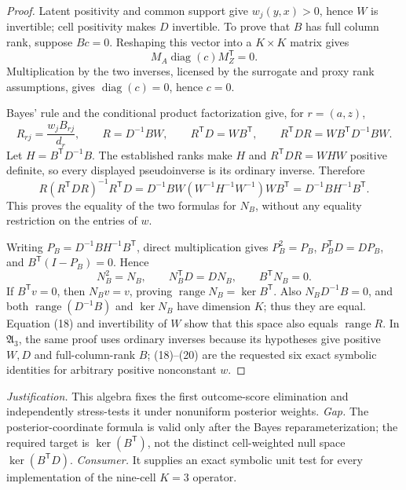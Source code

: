 \documentclass{article}
\begin{document}
\begin{proof}
Latent positivity and common support give \(w_j(y,x)>0\), hence \(W\) is invertible; cell positivity makes \(D\) invertible.  To prove that \(B\) has full column rank, suppose \(Bc=0\).  Reshaping this vector into a \(K\times K\) matrix gives
\[
M_A\operatorname{diag}(c)M_Z^{\mathsf T}=0.
\]
Multiplication by the two inverses, licensed by the surrogate and proxy rank assumptions, gives \(\operatorname{diag}(c)=0\), hence \(c=0\).

Bayes' rule and the conditional product factorization give, for \(r=(a,z)\),
\[
R_{rj}=\frac{w_jB_{rj}}{d_r},
\qquad R=D^{-1}BW,
\qquad R^{\mathsf T}D=WB^{\mathsf T},
\qquad R^{\mathsf T}DR=WB^{\mathsf T}D^{-1}BW. \tag{18}
\]
Let \(H=B^{\mathsf T}D^{-1}B\).  The established ranks make \(H\) and \(R^{\mathsf T}DR=WHW\) positive definite, so every displayed pseudoinverse is its ordinary inverse.  Therefore
\[
R(R^{\mathsf T}DR)^{-1}R^{\mathsf T}D
=D^{-1}BW(W^{-1}H^{-1}W^{-1})WB^{\mathsf T}
=D^{-1}BH^{-1}B^{\mathsf T}. \tag{19}
\]
This proves the equality of the two formulas for \(N_B\), without any equality restriction on the entries of \(w\).

Writing \(P_B=D^{-1}BH^{-1}B^{\mathsf T}\), direct multiplication gives \(P_B^2=P_B\), \(P_B^{\mathsf T}D=DP_B\), and \(B^{\mathsf T}(I-P_B)=0\).  Hence
\[
N_B^2=N_B,\qquad N_B^{\mathsf T}D=DN_B,\qquad B^{\mathsf T}N_B=0. \tag{20}
\]
If \(B^{\mathsf T}v=0\), then \(N_Bv=v\), proving \(\operatorname{range}N_B=\ker B^{\mathsf T}\).  Also \(N_BD^{-1}B=0\), and both \(\operatorname{range}(D^{-1}B)\) and \(\ker N_B\) have dimension \(K\); thus they are equal.  Equation (18) and invertibility of \(W\) show that this space also equals \(\operatorname{range}R\).  In \(\mathfrak A_3\), the same proof uses ordinary inverses because its hypotheses give positive \(W,D\) and full-column-rank \(B\); (18)--(20) are the requested six exact symbolic identities for arbitrary positive nonconstant \(w\).
\end{proof}
\par\smallskip\noindent \textit{Justification.} This algebra fixes the first outcome-score elimination and independently stress-tests it under nonuniform posterior weights. \textit{Gap.} The posterior-coordinate formula is valid only after the Bayes reparameterization; the required target is \(\ker(B^{\mathsf T})\), not the distinct cell-weighted null space \(\ker(B^{\mathsf T}D)\). \textit{Consumer.} It supplies an exact symbolic unit test for every implementation of the nine-cell \(K=3\) operator.
\end{document}
